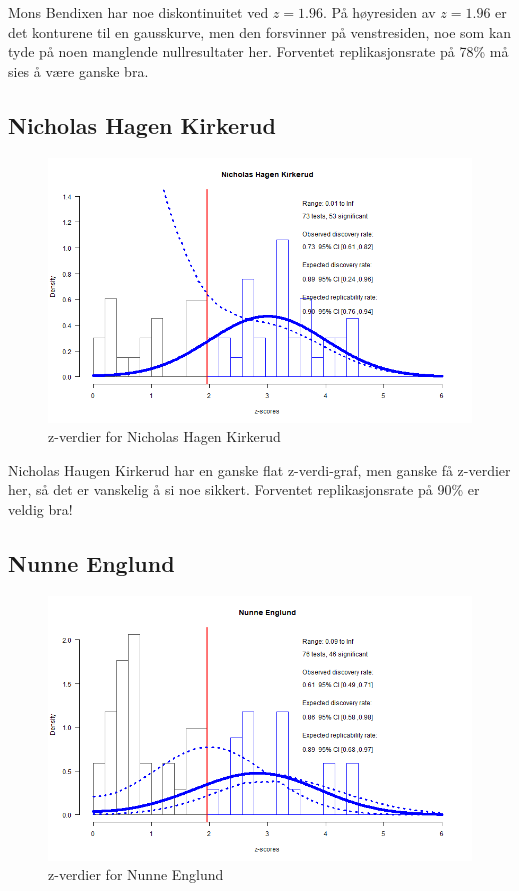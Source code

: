 \documentclass[doc,norsk]{apa7}
\begin{document}
Mons Bendixen har noe diskontinuitet ved $z=1.96$. På høyresiden av $z=1.96$ er det konturene til en gausskurve, men den forsvinner på venstresiden, noe som kan tyde på noen manglende nullresultater her. Forventet replikasjonsrate på 78\% må sies å være ganske bra.


\subsection{Nicholas Hagen Kirkerud}
\begin{figure}[h!]
    \centering
    \includegraphics[width=\textwidth]{images/Nicholas Hagen Kirkerud.png}
    \caption{z-verdier for Nicholas Hagen Kirkerud}
\end{figure}

Nicholas Haugen Kirkerud har en ganske flat z-verdi-graf, men ganske få z-verdier her, så det er vanskelig å si noe sikkert. Forventet replikasjonsrate på 90\% er veldig bra!

\subsection{Nunne Englund}
\begin{figure}[h!]
    \centering
    \includegraphics[width=\textwidth]{images/Nunne Englund.png}
    \caption{z-verdier for Nunne Englund}
\end{figure}
\end{document}
